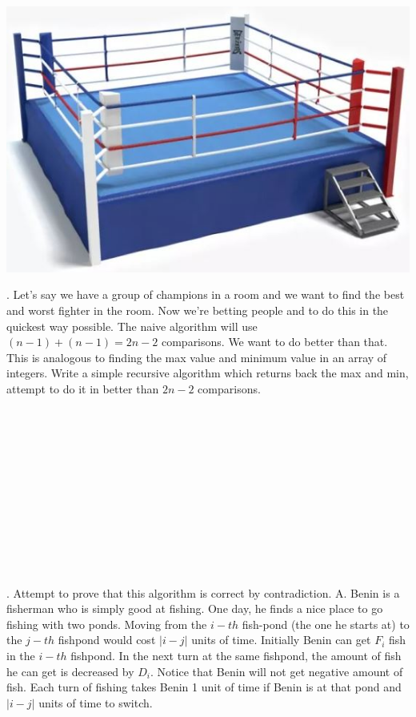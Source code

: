 \documentclass[12pt]{article}
\begin{document}
\centerline{\includegraphics[scale = 0.25]{boxing.jpg}}
. Let's say we have a group of champions in a room and we want to find the best and worst fighter in the room. Now we're betting people and to do this in the quickest way possible. The naive algorithm will use $(n-1) + (n-1) = 2n -2 $ comparisons. We want to do better than that. This is analogous to finding the max value and minimum value in an array of integers. Write a simple recursive algorithm which returns back the max and min, attempt to do it in better than $2n-2$ comparisons.\\\\\\\\\\\\\\\\\\\\\\\\\\
. Attempt to prove that this algorithm is correct by contradiction. 
\newpage
\noindent A. Benin is a fisherman who is simply good at fishing. One day, he finds a nice place to go fishing with two ponds. 
Moving from the $i-th$ fish-pond (the one he starts at) to the $j-th$ fishpond would cost $|i - j|$ units of time. 
Initially Benin can get $F_i$ fish in the $i-th$ fishpond. 
In the next turn at the same fishpond, the amount of fish he can get is decreased by $D_i$. 
Notice that Benin will not get negative amount of fish.
Each turn of fishing takes Benin 1 unit of time if Benin is at that pond and $|i - j|$ units of time to switch.
\\\\
\end{document}
